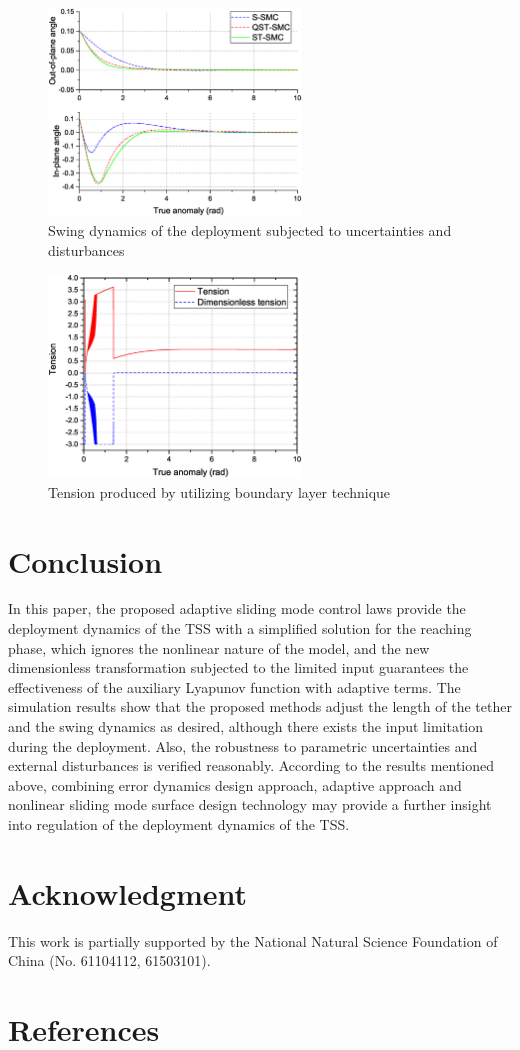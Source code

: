 \documentclass[3p]{elsarticle}
\theoremstyle{plain}
\theoremstyle{remark}
\begin{document}
\begin{figure}
\centering
\includegraphics[width=0.6\textwidth]{paper4_fig9_20161025.eps}
\caption{Swing dynamics of the deployment subjected to uncertainties and disturbances}
\label{fig:9}
\end{figure}
\begin{figure}
\centering
\includegraphics[width=0.6\textwidth]{paper4_fig10_20161025.eps}
\caption{Tension produced by utilizing boundary layer technique}
\label{fig:10}
\end{figure}
\section{Conclusion}\label{sec:5}
In this paper, the proposed adaptive sliding mode control laws provide the deployment dynamics of the TSS with a simplified solution for the reaching phase, which ignores the nonlinear nature of the model, and the new dimensionless transformation subjected to the limited input guarantees the effectiveness of the auxiliary Lyapunov function with adaptive terms. The simulation results show that the proposed methods adjust the length of the tether and the swing dynamics as desired, although there exists the input limitation during the deployment. Also, the robustness to parametric uncertainties and external disturbances is verified reasonably. According to the results mentioned above, combining error dynamics design approach, adaptive approach and nonlinear sliding mode surface design technology may provide a further insight into regulation of the deployment dynamics of the TSS.
\section{Acknowledgment}
This work is partially supported by the National Natural Science Foundation of China (No. 61104112, 61503101).
\section{References}


\end{document}
